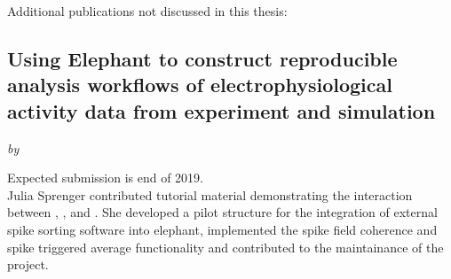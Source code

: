 \clearpage

Additional publications not discussed in this thesis:

\subsection*{Using Elephant to construct reproducible analysis workflows of electrophysiological activity data from experiment and simulation}
\textit{by }

Expected submission is end of 2019.\\

Julia Sprenger contributed tutorial material demonstrating the interaction between , ,  and . She developed a pilot structure for the integration of external spike sorting software into elephant, implemented the spike field coherence and spike triggered average functionality and contributed to the maintainance of the project.



\hypersetup{pageanchor=true} %
